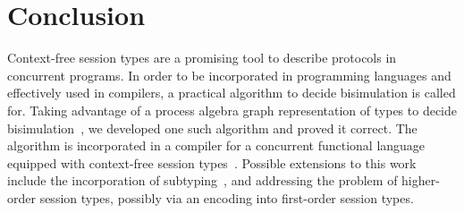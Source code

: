 \section{Conclusion}
\label{sec:conclusion}

Context-free session types are a promising tool to describe protocols
in concurrent programs. In order to be incorporated in programming
languages and effectively used in compilers, a practical algorithm to
decide bisimulation is called for.
%
Taking advantage of a process algebra graph representation of types to
decide
bisimulation~\cite{DBLP:journals/tcs/HirshfeldJM96,DBLP:conf/concur/HirshfeldM94},
we developed one such algorithm and proved it correct. The algorithm
is incorporated in a compiler for a concurrent functional language
equipped with context-free session
types~\cite{almeida.etal_freest-functional-language}.
%
Possible extensions to this work include the incorporation of
subtyping~\cite{DBLP:journals/acta/GayH05}, and addressing the problem
of higher-order session types, possibly via an encoding into
first-order session types.

\vspace*{1cm}


